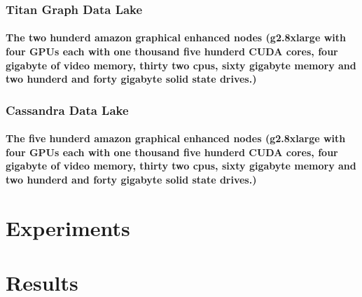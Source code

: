 \documentclass{acm_proc_article-sp}
\begin{document}
\subsubsection{Titan Graph Data Lake}
\paragraph{The two hunderd amazon graphical enhanced nodes (g2.8xlarge with four GPUs each with one thousand five hunderd CUDA cores, four gigabyte of video memory, thirty two cpus, sixty gigabyte memory and two hunderd and forty gigabyte solid state drives.)}\subsubsection{Cassandra Data Lake}
\paragraph{The five hunderd amazon graphical enhanced nodes (g2.8xlarge with four GPUs each with one thousand five hunderd CUDA cores, four gigabyte of video memory, thirty two cpus, sixty gigabyte memory and two hunderd and forty gigabyte solid state drives.)}
\newpage
\section{Experiments}
\section{Results}
\newpage


\end{document}

